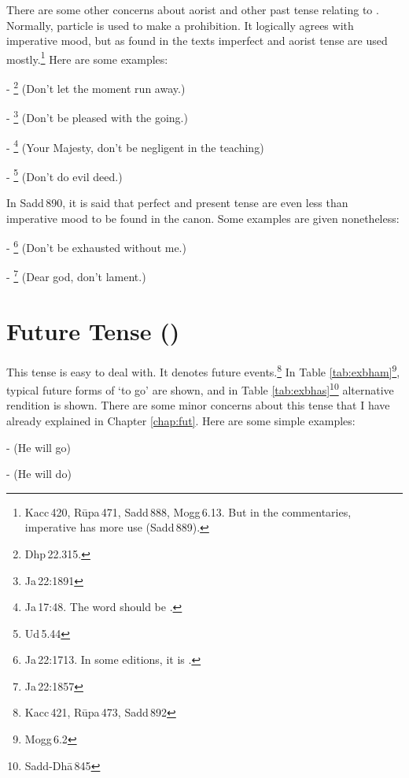 There are some other concerns about aorist and other past tense relating to .\label{par:vclassma} Normally, particle  is used to make a prohibition. It logically agrees with imperative mood, but as found in the texts imperfect and aorist tense are used mostly.\footnote{Kacc\,420, R\=upa\,471, Sadd\,888, Mogg\,6.13. But in the commentaries, imperative has more use (Sadd\,889).} Here are some examples:\par
- \footnote{Dhp\,22.315.} (Don't let the moment run away.)\par
- \footnote{Ja\,22:1891} (Don't be pleased with the going.)\par
- \footnote{Ja\,17:48. The word should be .} (Your Majesty, don't be negligent in the teaching)\par
- \footnote{Ud\,5.44} (Don't do evil deed.)\par
In Sadd\,890, it is said that perfect and present tense are even less than imperative mood to be found in the canon. Some examples are given nonetheless:\par
- \footnote{Ja\,22:1713. In some editions, it is .} (Don't be exhausted without me.)\par
- \footnote{Ja\,22:1857} (Dear god, don't lament.)\par

{}
\section*{Future Tense ()}

This tense is easy to deal with. It denotes future events.\footnote{Kacc\,421, R\=upa\,473, Sadd\,892} In Table \ref{tab:exbham}\footnote{Mogg\,6.2}, typical future forms of `to go' are shown, and in Table \ref{tab:exbhas}\footnote{Sadd-Dh\=a\,845} alternative rendition is shown. There are some minor concerns about this tense that I have already explained in Chapter \ref{chap:fut}. Here are some simple examples:

-  (He will go)\par
-  (He will do)\par

